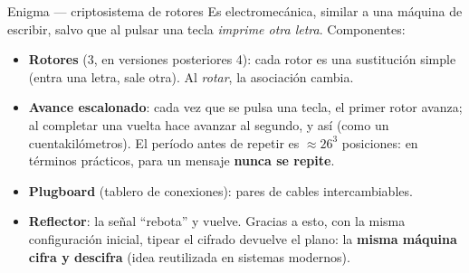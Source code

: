 \documentclass[11pt,a4paper]{article}
\begin{document}
\begin{defbox}{Enigma — criptosistema de rotores}
Es electromecánica, similar a una máquina de escribir, salvo que al pulsar una tecla
\emph{imprime otra letra}. Componentes:
\begin{itemize}[leftmargin=1.4em,itemsep=2pt]
  \item \textbf{Rotores} (3, en versiones posteriores 4): cada rotor es una sustitución
        simple (entra una letra, sale otra). Al \emph{rotar}, la asociación cambia.
  \item \textbf{Avance escalonado}: cada vez que se pulsa una tecla, el primer rotor avanza;
        al completar una vuelta hace avanzar al segundo, y así (como un cuentakilómetros). El
        período antes de repetir es $\approx 26^3$ posiciones: en términos prácticos, para un
        mensaje \textbf{nunca se repite}.
  \item \textbf{Plugboard} (tablero de conexiones): pares de cables intercambiables.
  \item \textbf{Reflector}: la señal ``rebota'' y vuelve. Gracias a esto, con la misma
        configuración inicial, tipear el cifrado devuelve el plano: la \textbf{misma máquina
        cifra y descifra} (idea reutilizada en sistemas modernos).
\end{itemize}
\end{defbox}
\end{document}
